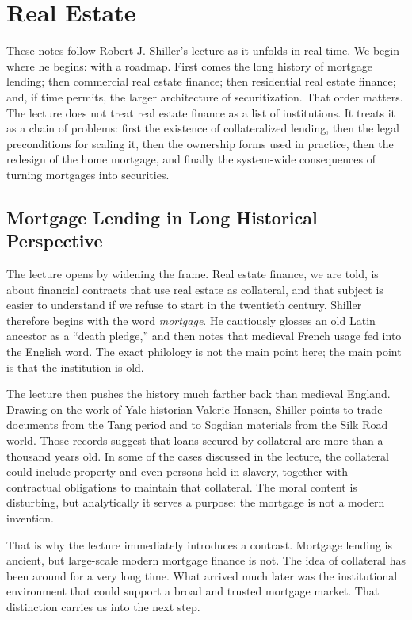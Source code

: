 \chapter{Real Estate}

These notes follow Robert J. Shiller's lecture as it unfolds in real time. We begin where he begins: with a roadmap. First comes the long history of mortgage lending; then commercial real estate finance; then residential real estate finance; and, if time permits, the larger architecture of securitization. That order matters. The lecture does not treat real estate finance as a list of institutions. It treats it as a chain of problems: first the existence of collateralized lending, then the legal preconditions for scaling it, then the ownership forms used in practice, then the redesign of the home mortgage, and finally the system-wide consequences of turning mortgages into securities.

\section{Mortgage Lending in Long Historical Perspective}

The lecture opens by widening the frame. Real estate finance, we are told, is about financial contracts that use real estate as collateral, and that subject is easier to understand if we refuse to start in the twentieth century. Shiller therefore begins with the word \emph{mortgage}. He cautiously glosses an old Latin ancestor as a ``death pledge,'' and then notes that medieval French usage fed into the English word. The exact philology is not the main point here; the main point is that the institution is old.

The lecture then pushes the history much farther back than medieval England. Drawing on the work of Yale historian Valerie Hansen, Shiller points to trade documents from the Tang period and to Sogdian materials from the Silk Road world. Those records suggest that loans secured by collateral are more than a thousand years old. In some of the cases discussed in the lecture, the collateral could include property and even persons held in slavery, together with contractual obligations to maintain that collateral. The moral content is disturbing, but analytically it serves a purpose: the mortgage is not a modern invention.

That is why the lecture immediately introduces a contrast. Mortgage lending is ancient, but large-scale modern mortgage finance is not. The idea of collateral has been around for a very long time. What arrived much later was the institutional environment that could support a broad and trusted mortgage market. That distinction carries us into the next step.

